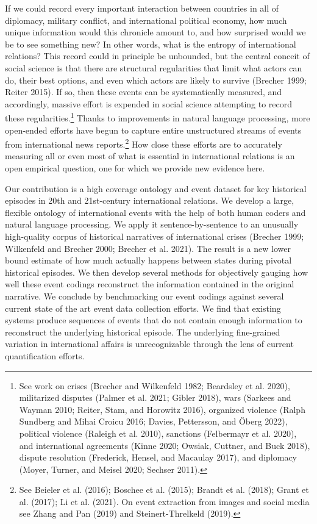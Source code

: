 \documentclass{article}
\begin{document}
If we could record every important interaction between countries in all
of diplomacy, military conflict, and international political economy,
how much unique information would this chronicle amount to, and how
surprised would we be to see something new? In other words, what is the
entropy of international relations? This record could in principle be
unbounded, but the central conceit of social science is that there are
structural regularities that limit what actors can do, their best
options, and even which actors are likely to survive (Brecher 1999;
Reiter 2015). If so, then these events can be systematically measured,
and accordingly, massive effort is expended in social science attempting
to record these regularities.\footnote{See work on crises (Brecher and
  Wilkenfeld 1982; Beardsley et al. 2020), militarized disputes (Palmer
  et al. 2021; Gibler 2018), wars (Sarkees and Wayman 2010; Reiter,
  Stam, and Horowitz 2016), organized violence (Ralph Sundberg and Mihai
  Croicu 2016; Davies, Pettersson, and Öberg 2022), political violence
  (Raleigh et al. 2010), sanctions (Felbermayr et al. 2020), and
  international agreements (Kinne 2020; Owsiak, Cuttner, and Buck 2018),
  dispute resolution (Frederick, Hensel, and Macaulay 2017), and
  diplomacy (Moyer, Turner, and Meisel 2020; Sechser 2011).} Thanks to
improvements in natural language processing, more open-ended efforts
have begun to capture entire unstructured streams of events from
international news reports.\footnote{See Beieler et al. (2016); Boschee
  et al. (2015); Brandt et al. (2018); Grant et al. (2017); Li et al.
  (2021). On event extraction from images and social media see Zhang and
  Pan (2019) and Steinert-Threlkeld (2019).} How close these efforts are
to accurately measuring all or even most of what is essential in
international relations is an open empirical question, one for which we
provide new evidence here.

Our contribution is a high coverage ontology and event dataset for key
historical episodes in 20th and 21st-century international relations. We
develop a large, flexible ontology of international events with the help
of both human coders and natural language processing. We apply it
sentence-by-sentence to an unusually high-quality corpus of historical
narratives of international crises (Brecher 1999; Wilkenfeld and Brecher
2000; Brecher et al. 2021). The result is a new lower bound estimate of
how much actually happens between states during pivotal historical
episodes. We then develop several methods for objectively gauging how
well these event codings reconstruct the information contained in the
original narrative. We conclude by benchmarking our event codings
against several current state of the art event data collection efforts.
We find that existing systems produce sequences of events that do not
contain enough information to reconstruct the underlying historical
episode. The underlying fine-grained variation in international affairs
is unrecognizable through the lens of current quantification efforts.
\end{document}
